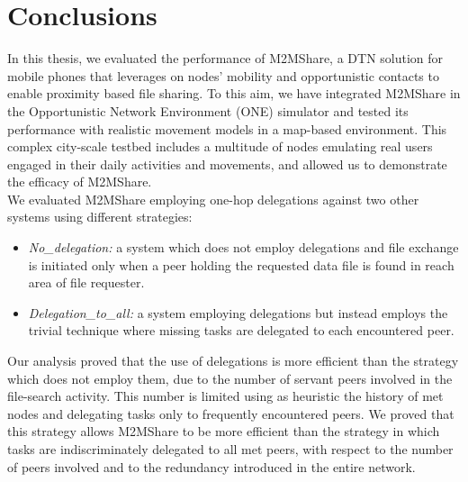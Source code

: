 
\chapter{Conclusions}\label{conclusioni} %




In this thesis, we evaluated the performance of M2MShare, a DTN solution for mobile phones that leverages on nodes' mobility and opportunistic contacts to enable proximity based file sharing. To this aim, we have integrated M2MShare in the Opportunistic Network Environment (ONE) simulator and tested its performance with realistic movement models in a map-based environment. This complex city-scale testbed includes a multitude of nodes emulating real users engaged in their daily activities and movements, and allowed us to demonstrate the efficacy of M2MShare. 
\\

We evaluated M2MShare employing one-hop delegations against two other systems using different strategies:
\begin{itemize}
\item \textit{No\_delegation:} a system which does not employ delegations and file exchange is initiated only when a peer holding the requested data file is found in reach area of file requester.
\item \textit{Delegation\_to\_all:} a system employing delegations but instead employs the trivial technique where missing tasks are delegated to each encountered peer.
\end{itemize}
Our analysis proved that the use of delegations is more efficient than the strategy which does not employ them, due to the number of servant peers involved in the file-search activity. This number is limited using as heuristic the history of met nodes and delegating tasks only to frequently encountered peers. We proved that this strategy allows M2MShare to be more efficient than the strategy in which tasks are indiscriminately delegated to all met peers, with respect to the number of peers involved and to the redundancy introduced in the entire network.
\\

